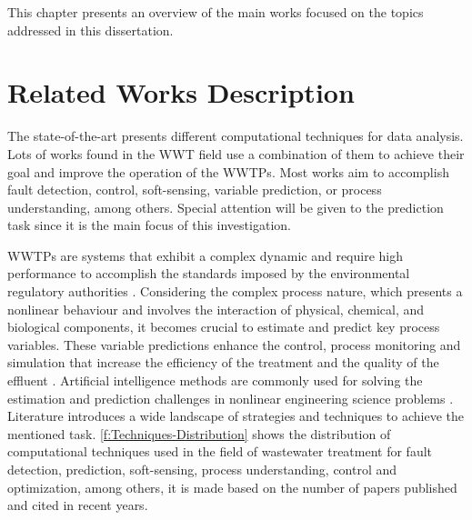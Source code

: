 This chapter presents an overview of the main works focused on the topics addressed in this dissertation.

\section{Related Works Description}
\label{s:RelatedWorks-Description}

The state-of-the-art presents different computational techniques for data analysis. Lots of works found in the \ac{WWT} field use a combination of them to achieve their goal and improve the operation of the \acs{WWTP}s. Most works aim to accomplish fault detection, control, soft-sensing, variable prediction, or process understanding, among others. Special attention will be given to the prediction task since it is the main focus of this investigation.

\ac{WWTP}s are systems that exhibit a complex dynamic and require high performance to accomplish the standards imposed by the environmental regulatory authorities \cite{Corominas2018}. Considering the complex process nature, which presents a nonlinear behaviour and involves the interaction of physical, chemical, and biological components, it becomes crucial to estimate and predict key process variables. These variable predictions enhance the control, process monitoring and simulation that increase the efficiency of the treatment and the quality of the effluent \cite{Aalami2019,Arismendy2020,Liu2020}. Artificial intelligence methods are commonly used for solving the estimation and prediction challenges in nonlinear engineering science problems \cite{Lotfi2019}. Literature introduces a wide landscape of strategies and techniques to achieve the mentioned task. \autoref{f:Techniques-Distribution} \cite{Corominas2018} shows the distribution of computational techniques used in the field of wastewater treatment for fault detection, prediction, soft-sensing, process understanding, control and optimization, among others, it is made based on the number of papers published and cited in recent years. 

